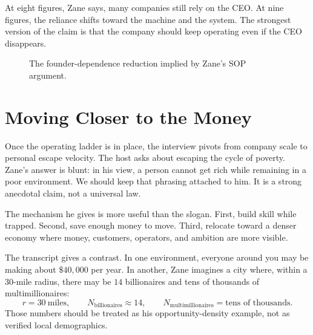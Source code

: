 At eight figures, Zane says, many companies still rely on the CEO. At nine figures, the reliance shifts toward the machine and the system. The strongest version of the claim is that the company should keep operating even if the CEO disappears.

\begin{figure}
\centering
{}
\caption{The founder-dependence reduction implied by Zane's SOP argument.}
\end{figure}

\section{Moving Closer to the Money}

Once the operating ladder is in place, the interview pivots from company scale to personal escape velocity. The host asks about escaping the cycle of poverty. Zane's answer is blunt: in his view, a person cannot get rich while remaining in a poor environment. We should keep that phrasing attached to him. It is a strong anecdotal claim, not a universal law.

The mechanism he gives is more useful than the slogan. First, build skill while trapped. Second, save enough money to move. Third, relocate toward a denser economy where money, customers, operators, and ambition are more visible.

The transcript gives a contrast. In one environment, everyone around you may be making about \(\$40{,}000\) per year. In another, Zane imagines a city where, within a \(30\)-mile radius, there may be \(14\) billionaires and tens of thousands of multimillionaires:
\begin{equation}
r=30\ \mathrm{miles},\qquad
N_{\mathrm{billionaires}}\approx 14,\qquad
N_{\mathrm{multimillionaires}}=\text{tens of thousands}.
\end{equation}
Those numbers should be treated as his opportunity-density example, not as verified local demographics.

